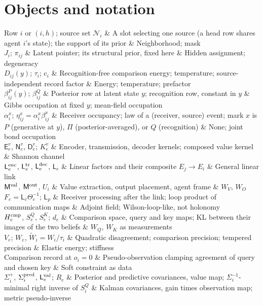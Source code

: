 \section{Objects and notation}
\label{comp:ch06-objects}

\begin{decoder}
Row $i$ or $(i,h)$; source set $\mathcal N_i$ & A slot selecting one source (a head row shares agent $i$'s state); the support of its prior & Neighborhood; mask\\
$J_i$; $\pi_{ij}$ & Latent pointer; its structural prior, fixed here & Hidden assignment; degeneracy\\
$D_{ij}(y)$; $\tau_i$; $\mathrm c_i$ & Recognition-free comparison energy; temperature; source-independent record factor & Energy; temperature; prefactor\\
$\beta^P_{ij}(y)$; $\beta^Q_{ij}$ & Posterior row at latent state $y$; recognition row, constant in $y$ & Gibbs occupation at fixed $y$; mean-field occupation\\
$\alpha^x_i$; $\eta^x_{ij}=\alpha^x_i\beta^x_{ij}$ & Receiver occupancy; law of a (receiver, source) event; mark $x$ is $P$ (generative at $y$), $\Pi$ (posterior-averaged), or $Q$ (recognition) & None; joint bond occupation\\
$\mathsf E^v_e$, $\mathsf N^v_e$, $\mathsf D^v_e$; $K^v_e$ & Encoder, transmission, decoder kernels; composed value kernel & Shannon channel\\
$\mathsf L^{\rm enc}_e$, $\mathsf L^{\rm tr}_e$, $\mathsf L^{\rm dec}_e$, $\mathsf L_e$ & Linear factors and their composite $E_j\to E_i$ & General linear link\\
$\mathsf M^{\rm val}$, $\mathsf M^{\rm out}$, $U_i$ & Value extraction, output placement, agent frame & $W_V$, $W_O$\\
$F_e=\mathsf L_e\Theta_e^{-1}$; $\mathsf L_p$ & Receiver processing after the link; loop product of communication maps & Adjoint field; Wilson-loop-like, not holonomy\\
$H^{\rm cmp}_e$, $S^Q_e$, $S^K_e$; $d_e$ & Comparison space, query and key maps; KL between their images of the two beliefs & $W_Q$, $W_K$ as measurements\\
$V_e$; $W_e$, $\widetilde W_i=W_i/\tau_i$ & Quadratic disagreement; comparison precision; tempered precision & Elastic energy; stiffness\\
Comparison record at $o_i=0$ & Pseudo-observation clamping agreement of query and chosen key & Soft constraint as data\\
$\Sigma^+_i$, $\Sigma^{\rm pred}_i$, $\mathsf L^{\rm val}_e$; $R_e$ & Posterior and predictive covariances, value map; $\Sigma_i^{-1}$-minimal right inverse of $S^Q_i$ & Kalman covariances, gain times observation map; metric pseudo-inverse\\
\end{decoder}

